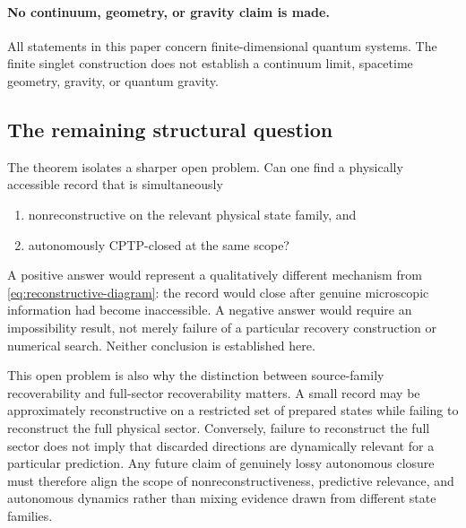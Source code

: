 \paragraph{No continuum, geometry, or gravity claim is made.}
All statements in this paper concern finite-dimensional quantum systems.  The finite singlet construction does not establish a continuum limit, spacetime geometry, gravity, or quantum gravity.

\subsection{The remaining structural question}

The theorem isolates a sharper open problem.  Can one find a physically accessible record that is simultaneously
\begin{enumerate}[label=(\roman*)]
  \item nonreconstructive on the relevant physical state family, and
  \item autonomously CPTP-closed at the same scope?
\end{enumerate}
A positive answer would represent a qualitatively different mechanism from \cref{eq:reconstructive-diagram}: the record would close after genuine microscopic information had become inaccessible.  A negative answer would require an impossibility result, not merely failure of a particular recovery construction or numerical search.  Neither conclusion is established here.

This open problem is also why the distinction between source-family recoverability and full-sector recoverability matters.  A small record may be approximately reconstructive on a restricted set of prepared states while failing to reconstruct the full physical sector.  Conversely, failure to reconstruct the full sector does not imply that discarded directions are dynamically relevant for a particular prediction.  Any future claim of genuinely lossy autonomous closure must therefore align the scope of nonreconstructiveness, predictive relevance, and autonomous dynamics rather than mixing evidence drawn from different state families.
